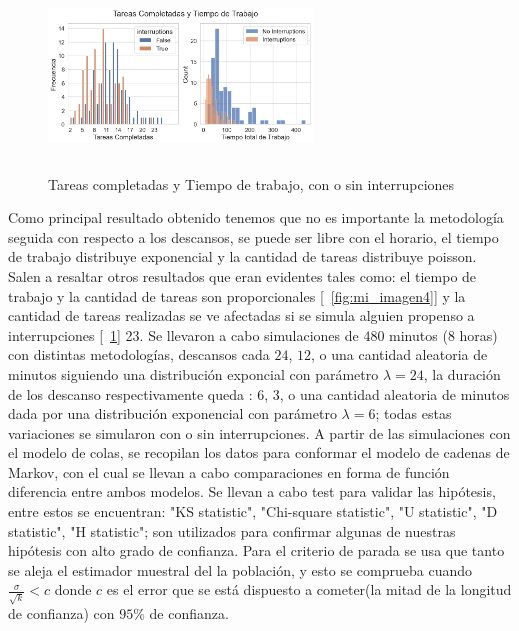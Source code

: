 \documentclass[10pt,a4paper,twocolumn]{article}
\begin{document}
\begin{figure}[H] %
    \centering %
    \includegraphics[width=7cm, height=5cm]{tareas_interrupciones.png} %
    \caption{Tareas completadas y Tiempo de trabajo, con o sin interrupciones} %
    \label{fig:mi_imagen5} %
\end{figure}


Como principal resultado obtenido tenemos que no es importante la metodología seguida con respecto a los descansos, se puede ser libre con el horario, el tiempo de trabajo distribuye exponencial y la cantidad de tareas distribuye poisson. Salen a resaltar otros resultados que eran evidentes tales como: el tiempo de trabajo y la cantidad de tareas son proporcionales [~\ref{fig:mi_imagen4}] y la cantidad de tareas realizadas se ve afectadas si se simula alguien propenso a interrupciones [~\ref{fig:mi_imagen5}] 23. Se llevaron a cabo simulaciones de $480$ minutos ($8$ horas) con distintas metodologías, descansos cada $24$, $12$, o una cantidad aleatoria de minutos siguiendo una distribuci\'on exponcial con par\'ametro $\lambda = 24$, la duración de los descanso respectivamente queda : $6$, $3$, o una  cantidad aleatoria de minutos dada por una distribuci\'on exponencial con par\'ametro $\lambda = 6$; todas estas variaciones se simularon con o sin interrupciones. A partir de las simulaciones con el modelo de colas, se recopilan los datos para conformar el modelo de cadenas de Markov, con el cual se llevan a cabo comparaciones en forma de funci\'on diferencia entre ambos modelos. Se llevan a cabo test para validar las hip\'otesis, entre estos se encuentran: "KS statistic", "Chi-square statistic", "U statistic", "D statistic", "H statistic"; son utilizados para confirmar algunas de nuestras hip\'otesis con alto grado de confianza. Para el criterio de parada se usa que tanto se aleja el estimador muestral del la poblaci\'on, y esto se comprueba cuando $\frac{\sigma}{\sqrt{k}} < c$ donde $c$ es el error que se est\'a dispuesto a cometer(la mitad de la longitud de confianza) con $95\%$ de confianza. 
\end{document}
